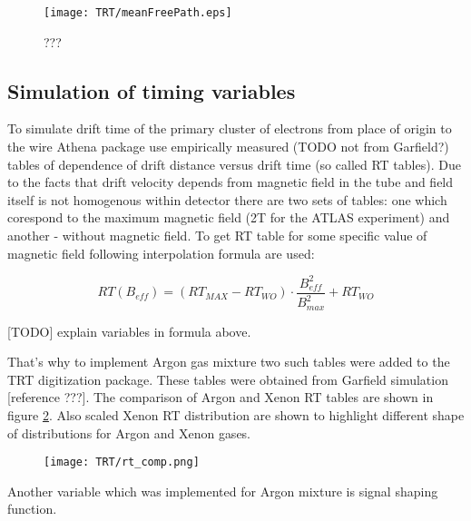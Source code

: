 \begin{figure}
\begin{center}
 \texttt{[image: TRT/meanFreePath.eps]}
\caption{\label{fig:meanFreePath} ???}
\end{center}
\end{figure}


\subsection{Simulation of timing variables}

To simulate drift time of the primary cluster of electrons from place of origin to the wire Athena package 
use empirically measured (TODO not from Garfield?) tables of dependence of drift distance versus drift time (so called RT tables). 
Due to the facts that drift velocity depends from magnetic field in the tube and field itself is not homogenous within detector 
there are two sets of tables: one which corespond to the maximum magnetic field (2T for the ATLAS experiment) and another - without magnetic field. To get RT table
for some specific value of magnetic field following interpolation formula are used:

\begin{displaymath}
    RT(B_{eff}) = (RT_{MAX} - RT_{WO}) \cdot \dfrac{B_{eff}^2}{B_{max}^2} + RT_{WO}
\end{displaymath}

[TODO] explain variables in formula above.

That's why to implement Argon gas mixture two such tables were added to the TRT digitization package.
These tables were obtained from Garfield simulation [reference ???].
The comparison of Argon and Xenon RT tables are shown in figure \ref{fig:rt_comp}. 
Also scaled Xenon RT distribution are shown to highlight different shape of distributions for Argon and Xenon gases.


\begin{figure}
\begin{center}
 \texttt{[image: TRT/rt\_comp.png]}
\caption{\label{fig:rt_comp} }
\end{center}
\end{figure}

Another variable which was implemented for Argon mixture is signal shaping function. 

